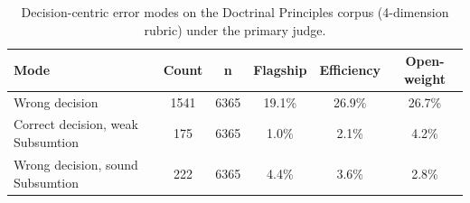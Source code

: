 \begin{table}[t]
\centering\footnotesize
\caption{Decision-centric error modes on the Doctrinal Principles corpus (4-dimension rubric) under the primary judge.}
\label{tbl-error-modes-grundpr}
\setlength{\tabcolsep}{4pt}
\begin{tabular*}{\textwidth}{@{\extracolsep{\fill}}lccccc@{}}
\toprule
Mode & Count & n & Flagship & Efficiency & Open-weight \\
\midrule
Wrong decision & 1541 & 6365 & 19.1\% & 26.9\% & 26.7\% \\
Correct decision, weak Subsumtion & 175 & 6365 & 1.0\% & 2.1\% & 4.2\% \\
Wrong decision, sound Subsumtion & 222 & 6365 & 4.4\% & 3.6\% & 2.8\% \\
\bottomrule
\end{tabular*}
\end{table}
